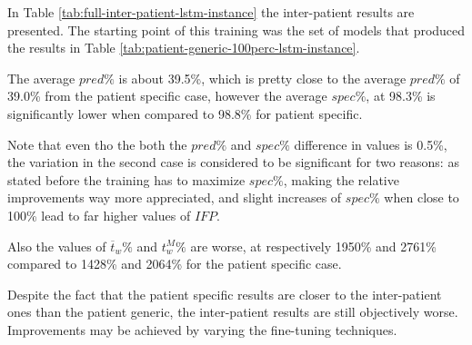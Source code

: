 In Table \ref{tab:full-inter-patient-lstm-instance} the inter-patient results are presented. The starting point of this training was the set of models that produced the results in Table \ref{tab:patient-generic-100perc-lstm-instance}.

The average $pred\%$ is about 39.5\%, which is pretty close to the average $pred\%$ of 39.0\% from the patient specific case, however the average $spec\%$, at 98.3\% is significantly lower when compared to 98.8\% for patient specific. 

Note that even tho the both the $pred\%$ and $spec\%$ difference in values is 0.5\%, the variation in the second case is considered to be significant for two reasons: as stated before the training has to maximize $spec\%$, making the relative improvements way more appreciated, and slight increases of $spec\%$ when close to 100\% lead to far higher values of $IFP$.

Also the values of $\overline{t}_w\%$ and $t_w^M\%$ are worse, at respectively 1950\% and 2761\% compared to 1428\% and 2064\% for the patient specific case.

Despite the fact that the patient specific results are closer to the inter-patient ones than the patient generic, the inter-patient results are still objectively worse. Improvements may be achieved by varying the fine-tuning techniques.

